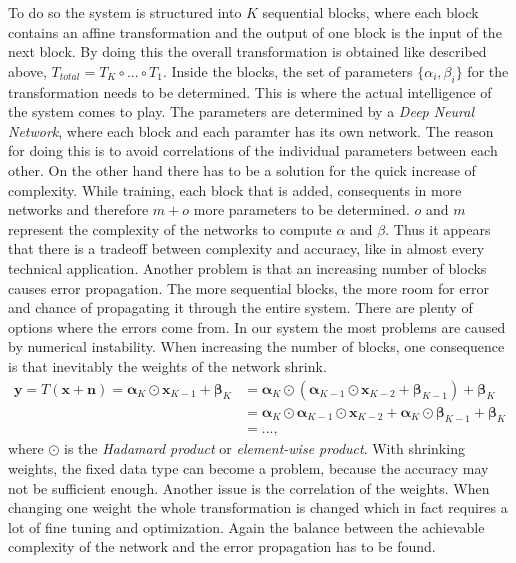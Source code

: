 \documentclass[oneside]{msvreport}%
\newcommand{\B}[1]{\boldsymbol{#1}}
\newcommand{\e}[1]{\emph{#1}}
\begin{document}
\noindent To do so the system is structured into $K$ sequential blocks, where each block contains an affine transformation and the output of one block is the input of the next block. By doing this the overall transformation is obtained like described above, $T_{total} = T_K \circ ... \circ T_1$. Inside the blocks, the set of parameters $\{\alpha_i, \beta_i\}$ for the transformation needs to be determined. This is where the actual intelligence of the system comes to play. The parameters are determined by a \e{Deep Neural Network}, where each block and each paramter has its own network. The reason for doing this is to avoid correlations of the individual parameters between each other. On the other hand there has to be a solution for the quick increase of complexity. While training, each block that is added, consequents in more networks and therefore $m + o$ more parameters to be determined. $o$ and $m$ represent the complexity of the networks to compute $\alpha$ and $\beta$. Thus it appears that there is a tradeoff between complexity and accuracy, like in almost every technical application. Another problem is that an increasing number of blocks causes error propagation. The more sequential blocks, the more room for error and chance of propagating it through the entire system. There are plenty of options where the errors come from. In our system the most problems are caused by numerical instability. When increasing the number of blocks, one consequence is that inevitably the weights of the network shrink.
\begin{equation}
\begin{split}
  \B{y} = T(\B{x} + \B{n}) = \B{\alpha}_K \odot \B{x}_{K - 1} + \B{\beta}_K & = \B{\alpha}_K \odot (\B{\alpha}_{K - 1} \odot \B{x}_{K - 2} + \B{\beta}_{K-1}) +\B{\beta}_K  \\ & = \B{\alpha}_K \odot \B{\alpha}_{K - 1} \odot \B{x}_{K - 2} + \B{\alpha}_K \odot \B{\beta}_{K-1} + \B{\beta}_K \\ & = ...,
\end{split}
\end{equation}
 where $\odot$ is the \e{Hadamard product} or \e{element-wise product}. With shrinking weights, the fixed data type can become a problem, because the accuracy may not be sufficient enough. Another issue is the correlation of the weights. When changing one weight the whole transformation is changed which in fact requires a lot of fine tuning and optimization. Again the balance between the achievable complexity of the network and the error propagation has to be found.\\
\end{document}
